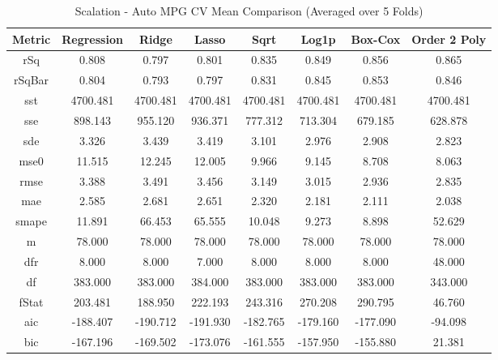 \documentclass{article}
\begin{document}
\begin{table}[H]
\centering
\caption{Scalation - Auto MPG CV Mean Comparison (Averaged over 5 Folds)}
\label{tab:Scalation: - Auto MPG CV Mean Comparison}
\begin{tabular}{|c|c|c|c|c|c|c|c|} \hline
Metric & Regression & Ridge & Lasso & Sqrt & Log1p &  Box-Cox & Order 2 Poly \\\hline \hline
rSq & 0.808 & 0.797 & 0.801 & 0.835 & 0.849 & 0.856 & 0.865 \\\hline
rSqBar & 0.804 & 0.793 & 0.797 & 0.831 & 0.845 & 0.853 & 0.846 \\\hline
sst & 4700.481 & 4700.481 & 4700.481 & 4700.481 & 4700.481 & 4700.481 & 4700.481 \\\hline
sse & 898.143 & 955.120 & 936.371 & 777.312 & 713.304 & 679.185 & 628.878 \\\hline
sde & 3.326 & 3.439 & 3.419 & 3.101 & 2.976 & 2.908 & 2.823 \\\hline
mse0 & 11.515 & 12.245 & 12.005 & 9.966 & 9.145 & 8.708 & 8.063 \\\hline
rmse & 3.388 & 3.491 & 3.456 & 3.149 & 3.015 & 2.936 & 2.835 \\\hline
mae & 2.585 & 2.681 & 2.651 & 2.320 & 2.181 & 2.111 & 2.038 \\\hline
smape & 11.891 & 66.453 & 65.555 & 10.048 & 9.273 & 8.898 & 52.629 \\\hline
m & 78.000 & 78.000 & 78.000 & 78.000 & 78.000 & 78.000 & 78.000 \\\hline
dfr & 8.000 & 8.000 & 7.000 & 8.000 & 8.000 & 8.000 & 48.000 \\\hline
df & 383.000 & 383.000 & 384.000 & 383.000 & 383.000 & 383.000 & 343.000 \\\hline
fStat & 203.481 & 188.950 & 222.193 & 243.316 & 270.208 & 290.795 & 46.760 \\\hline
aic & -188.407 & -190.712 & -191.930 & -182.765 & -179.160 & -177.090 & -94.098 \\\hline
bic & -167.196 & -169.502 & -173.076 & -161.555 & -157.950 & -155.880 & 21.381 \\\hline
\end{tabular}
\end{table}
\end{document}
